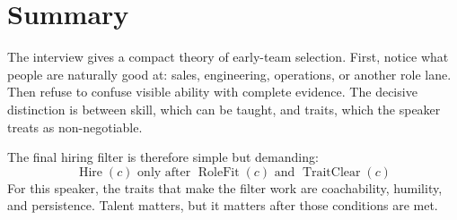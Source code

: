 \section{Summary}

The interview gives a compact theory of early-team selection. First, notice what people are naturally good at: sales, engineering, operations, or another role lane. Then refuse to confuse visible ability with complete evidence. The decisive distinction is between skill, which can be taught, and traits, which the speaker treats as non-negotiable.

The final hiring filter is therefore simple but demanding:
\begin{equation}
  \boxed{
  \operatorname{Hire}(c)
  \text{ only after }
  \operatorname{RoleFit}(c)
  \text{ and }
  \operatorname{TraitClear}(c)
  }
\end{equation}
For this speaker, the traits that make the filter work are coachability, humility, and persistence. Talent matters, but it matters after those conditions are met.